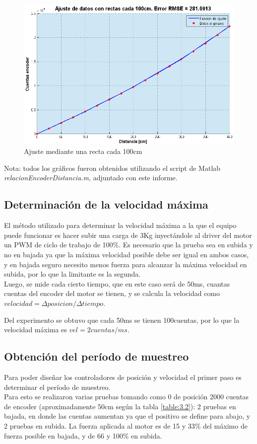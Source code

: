\begin{figure}[!ht]
	\centering
	\includegraphics[width=15cm,scale=1]{resources/3_13-ajusteRectas100cm.png}
	\caption{Ajuste mediante una recta cada 100cm}
	\label{fig:\thefigure}
\end{figure}

\textcolor{FIXME}{Nota: todos los gráficos fueron obtenidos utilizando el script de Matlab \textit{relacionEncoderDistancia.m}, adjuntado con este informe.}

\subsection{Determinación de la velocidad máxima}
El método utilizado para determinar la velocidad máxima a la que el equipo puede funcionar es hacer subir una carga de 3Kg inyectándole al driver del  motor un PWM de ciclo de trabajo de 100\%. Es necesario que la prueba sea en subida y no en bajada ya que la máxima velocidad posible debe ser igual en ambos casos, y en bajada seguro necesito menos fuerza para alcanzar la máxima velocidad en subida, por lo que la limitante es la segunda. \\
Luego, se mide cada cierto tiempo, que en este caso será de 50ms, cuantas cuentas del encoder del motor se tienen, y se calcula la velocidad como \(velocidad = \Delta posicion/\Delta tiempo \).

Del experimento se obtuvo que cada 50ms se tienen 100cuentas, por lo que la velocidad máxima es \(vel = 2cuentas/ms\).

\subsection{Obtención del período de muestreo}
Para poder diseñar los controladores de posición y velocidad el primer paso es determinar el período de muestreo. \\
Para esto se realizaron varias pruebas tomando como 0 de posición 2000 cuentas de encoder (aproximadamente 50cm según la tabla \ref{table:3.2}): 2 pruebas en bajada, en donde las cuentas aumentan ya que el positivo se define para abajo, y 2 pruebas en subida. La fuerza aplicada al motor es de 15 y 33\% del máximo de fuerza posible en bajada, y de 66 y 100\% en subida.



